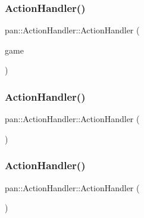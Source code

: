 \subsubsection{\texorpdfstring{Action\+Handler()}{ActionHandler()}\hspace{0.1cm}{\footnotesize\ttfamily [1/3]}}
{\footnotesize\ttfamily pan\+::\+Action\+Handler\+::\+Action\+Handler (\begin{DoxyParamCaption}\item[{\hyperlink{classpan_1_1_game}{Game} \&}]{game }\end{DoxyParamCaption})\hspace{0.3cm}{\ttfamily [explicit]}}

\mbox{\label{classpan_1_1_action_handler_a56b3a54ca19b9d071adffa0a9ac7b266}} 
\subsubsection{\texorpdfstring{Action\+Handler()}{ActionHandler()}\hspace{0.1cm}{\footnotesize\ttfamily [2/3]}}
{\footnotesize\ttfamily pan\+::\+Action\+Handler\+::\+Action\+Handler (\begin{DoxyParamCaption}{ }\end{DoxyParamCaption})\hspace{0.3cm}{\ttfamily [delete]}}

\mbox{\label{classpan_1_1_action_handler_a403ff5c81573b682a5dfc9d476be8e4e}} 
\subsubsection{\texorpdfstring{Action\+Handler()}{ActionHandler()}\hspace{0.1cm}{\footnotesize\ttfamily [3/3]}}
{\footnotesize\ttfamily pan\+::\+Action\+Handler\+::\+Action\+Handler (\begin{DoxyParamCaption}\item[{const \hyperlink{classpan_1_1_action_handler}{Action\+Handler} \&}]{ }\end{DoxyParamCaption})\hspace{0.3cm}{\ttfamily [delete]}}


